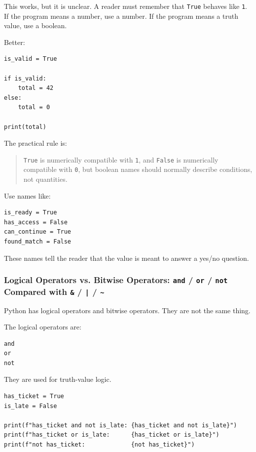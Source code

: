 This works, but it is unclear. A reader must remember that \texttt{True} behaves like \texttt{1}. If the program means a number, use a number. If the program means a truth value, use a boolean.

Better:

\begin{verbatim}
is_valid = True

if is_valid:
    total = 42
else:
    total = 0

print(total)
\end{verbatim}

The practical rule is:

\begin{quote}
\texttt{True} is numerically compatible with \texttt{1}, and \texttt{False} is numerically compatible with \texttt{0}, but boolean names should normally describe conditions, not quantities.
\end{quote}

Use names like:

\begin{verbatim}
is_ready = True
has_access = False
can_continue = True
found_match = False
\end{verbatim}

These names tell the reader that the value is meant to answer a yes/no question.

\subsubsection{Logical Operators vs. Bitwise Operators: \texttt{and} / \texttt{or} / \texttt{not} Compared with \texttt{\&} / \texttt{|} / \texttt{\textasciitilde{}}}

Python has logical operators and bitwise operators. They are not the same thing.

The logical operators are:

\begin{verbatim}
and
or
not
\end{verbatim}

They are used for truth-value logic.

\begin{verbatim}
has_ticket = True
is_late = False

print(f"has_ticket and not is_late: {has_ticket and not is_late}")
print(f"has_ticket or is_late:      {has_ticket or is_late}")
print(f"not has_ticket:             {not has_ticket}")
\end{verbatim}

